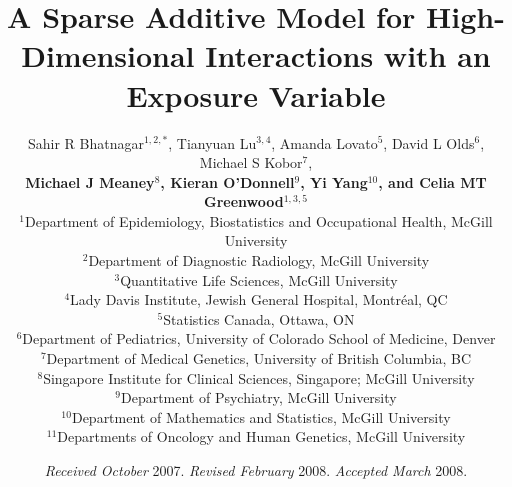 \documentclass[useAMS,usenatbib,referee]{biom}
\title[A Sparse Additive Model for High-Dimensional Interactions with an Exposure Variable]{A Sparse Additive Model for High-Dimensional Interactions with an Exposure Variable}
\author{Sahir R Bhatnagar$^{1,2,*}$\email{sahir.bhatnagar@mcgill.ca}, Tianyuan Lu$^{3,4}$, Amanda Lovato$^{5}$, David L Olds$^{6}$,
Michael S Kobor$^{7}$,\\ \textbf{Michael J Meaney$^{8}$, Kieran O'Donnell$^{9}$, Yi Yang$^{10}$, and
Celia MT Greenwood$^{1,3,5}$}\\
\textbf{}$^1$Department of Epidemiology, Biostatistics and Occupational Health, McGill University\\\textbf{}$^2$Department of Diagnostic Radiology, McGill University\\\textbf{}$^3$Quantitative Life Sciences, McGill University\\ \textbf{}$^4$Lady Davis Institute, Jewish General Hospital, Montr\'{e}al, QC\\ \textbf{}$^5$Statistics Canada, Ottawa, ON\\ \textbf{}$^6$Department of Pediatrics, University of Colorado School of Medicine, Denver\\ \textbf{}$^7$Department of Medical Genetics, University of British Columbia, BC\\ \textbf{}$^8$Singapore Institute for Clinical Sciences, Singapore; McGill University\\ \textbf{}$^9$Department of Psychiatry, McGill University\\ \textbf{}$^{10}$Department of Mathematics and Statistics, McGill University\\ \textbf{}$^{11}$Departments of Oncology and Human Genetics, McGill University}
\begin{document}

\date{{\it Received October} 2007. {\it Revised February} 2008.  {\it
Accepted March} 2008.}



\pagerange{\pageref{firstpage}--\pageref{lastpage}} 




\label{firstpage}

\end{document}
